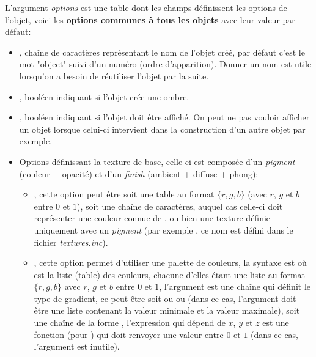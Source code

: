 L'argument \emph{options} est une table dont les champs définissent les options de l'objet, voici les \textbf{options communes à tous les objets} avec leur valeur par défaut:
\begin{itemize}
    \item {}, chaîne de caractères représentant le nom de l'objet créé, par défaut c'est le mot "object" suivi d'un numéro (ordre d'apparition). Donner un nom est utile lorsqu'on a besoin de réutiliser l'objet par la suite.
    
    \item {}, booléen indiquant si l'objet crée une ombre.
    
    \item {}, booléen indiquant si l'objet doit être affiché. On peut ne pas vouloir afficher un objet lorsque celui-ci intervient dans la construction d'un autre objet par exemple.
    
    \item Options définissant la texture de base, celle-ci est composée d'un \emph{pigment} (couleur + opacité) et d'un \emph{finish} (ambient + diffuse + phong):
        \begin{itemize}
            \item {}, cette option peut être soit une table au format $\{r,g,b\}$ (avec $r$, $g$ et $b$ entre $0$ et $1$), soit une chaîne de caractères, auquel cas celle-ci doit représenter une couleur connue de \povray, ou bien une texture définie uniquement avec un \emph{pigment} (par exemple , ce nom est défini dans le fichier \emph{textures.inc}).
            
            \item {}, cette option permet d'utiliser une palette de couleurs, la syntaxe est  où  est la liste (table) des couleurs, chacune d'elles étant une liste au format $\{r,g,b\}$ avec $r$, $g$ et $b$ entre $0$ et $1$, l'argument  est une chaîne qui définit le type de gradient, ce peut être soit  ou  ou  (dans ce cas, l'argument  doit être une liste contenant la valeur minimale et la valeur maximale), soit une chaîne de la forme , l'expression qui dépend de $x$, $y$ et $z$ est une fonction (pour \povray) qui doit renvoyer une valeur entre $0$ et $1$ (dans ce cas, l'argument  est inutile).
            

\end{itemize}
\end{itemize}
